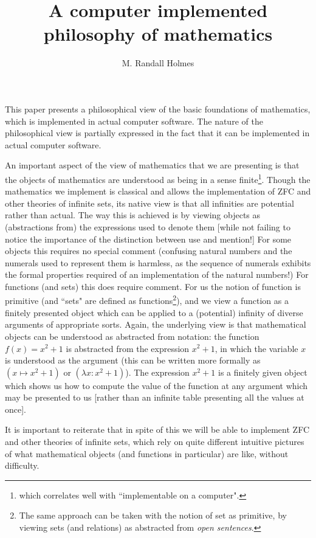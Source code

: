 \documentclass[12pt]{article}
\title{A computer implemented philosophy of mathematics}
\author{M. Randall Holmes}
\begin{document}
\maketitle

This paper presents a philosophical view of the basic foundations of mathematics, which is implemented in actual computer software.  The nature of the philosophical view is partially expressed in the fact that it can be implemented in actual computer software.

An important aspect of the view of mathematics that we are presenting is that the objects of mathematics are understood as being in a sense finite\footnote{which correlates well with ``implementable on a computer".}.  Though the mathematics we implement is classical and allows the implementation of ZFC and other theories of infinite sets, its native view is that all infinities are potential rather than actual.
The way this is achieved is by viewing objects as (abstractions from) the expressions used to denote them [while not failing to notice the importance of the  distinction between use and mention!]  For some objects this requires no special comment (confusing natural numbers and the numerals used to represent them is harmless, as the sequence of numerals exhibits the formal properties required of an implementation of the natural numbers!)   For functions (and sets) this does require comment.  For us the notion of function is primitive (and ``sets" are defined as functions\footnote{The same approach can be taken with the notion of set as primitive, by viewing sets (and relations) as abstracted from {\em open sentences}.}), and we view a function as a finitely presented object
which can be applied to a (potential) infinity of diverse arguments of appropriate sorts.  Again, the underlying view is that mathematical objects can be understood as abstracted from notation:  the function $f(x) = x^2+1$ is abstracted from the expression $x^2+1$, in which the variable $x$ is understood as the argument (this can be written more formally as $(x \mapsto x^2+1)$ or $(\lambda x:x^2+1)$).  The expression $x^2+1$ is a finitely given object which shows us how to compute the value of the function at any argument which may be presented to us [rather than an infinite table presenting all the values at once]. 

It is important to reiterate that in spite of this we will be able to implement ZFC and other theories of infinite sets, which rely on quite different intuitive pictures of what mathematical objects (and functions in particular) are like, without difficulty.
\end{document}
